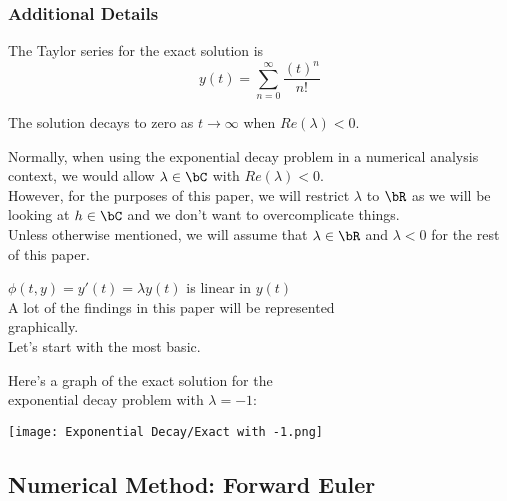 \subsubsection{Additional Details}
\begin{multicols}{2}
The Taylor series for the exact solution is 
\[y(t) = \sum\limits_{n=0}^{\infty} \frac{{(t)}^n}{n!}\]

The solution decays to zero as $t \rightarrow \infty$ when $Re(\lambda) < 0$.\\

\par Normally, when using the exponential decay problem in a numerical analysis context, we would allow $\lambda \in \bC$ with $Re(\lambda)<0$.\\
However, for the purposes of this paper, we will restrict $\lambda$ to $\bR$ as we will be looking at $h \in \bC$ and we don't want to overcomplicate things.\\
Unless otherwise mentioned, we will assume that $\lambda \in \bR$ and $\lambda < 0$ for the rest of this paper.\\

\par $\phi(t, y) = y'(t) = \lambda y(t)$ is linear in $y(t)$\\

\columnbreak{}
\hspace*{0.75cm}
A lot of the findings in this paper will be represented\\
\hspace*{0.75cm}
graphically.\\
\hspace*{0.75cm}
Let's start with the most basic.\\
\par \hspace*{0.75cm}
Here's a graph of the exact solution for the\\ 
\hspace*{0.75cm}
exponential decay problem with $\lambda = -1$:
\begin{center}
\texttt{[image: Exponential Decay/Exact with -1.png]}
\end{center}
\end{multicols}

\newpage
\subsection{Numerical Method: Forward Euler}

